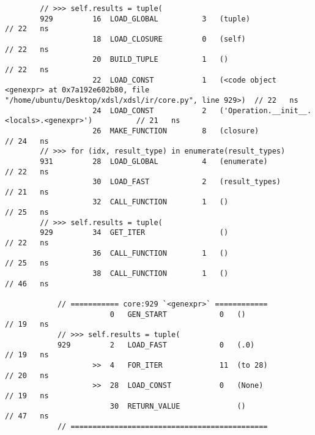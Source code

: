 \begin{code}
\begin{verbatim}
        // >>> self.results = tuple(
        929         16  LOAD_GLOBAL          3   (tuple)                                            // 22   ns
                    18  LOAD_CLOSURE         0   (self)                                             // 22   ns
                    20  BUILD_TUPLE          1   ()                                                 // 22   ns
                    22  LOAD_CONST           1   (<code object <genexpr> at 0x7a192e602b80, file "/home/ubuntu/Desktop/xdsl/xdsl/ir/core.py", line 929>)  // 22   ns
                    24  LOAD_CONST           2   ('Operation.__init__.<locals>.<genexpr>')          // 21   ns
                    26  MAKE_FUNCTION        8   (closure)                                          // 24   ns
        // >>> for (idx, result_type) in enumerate(result_types)
        931         28  LOAD_GLOBAL          4   (enumerate)                                        // 22   ns
                    30  LOAD_FAST            2   (result_types)                                     // 21   ns
                    32  CALL_FUNCTION        1   ()                                                 // 25   ns
        // >>> self.results = tuple(
        929         34  GET_ITER                 ()                                                 // 22   ns
                    36  CALL_FUNCTION        1   ()                                                 // 25   ns
                    38  CALL_FUNCTION        1   ()                                                 // 46   ns

            // =========== core:929 `<genexpr>` ============
                        0   GEN_START            0   ()                                             // 19   ns
            // >>> self.results = tuple(
            929         2   LOAD_FAST            0   (.0)                                           // 19   ns
                    >>  4   FOR_ITER             11  (to 28)                                        // 20   ns
                    >>  28  LOAD_CONST           0   (None)                                         // 19   ns
                        30  RETURN_VALUE             ()                                             // 47   ns
            // =============================================


\end{verbatim}
\end{code}
